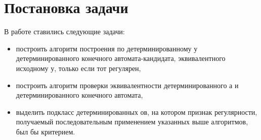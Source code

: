 \chapter{Постановка задачи} \label{chapt_task}
В работе ставились следующие задачи: 
\begin{itemize}
	\item построить алгоритм построения по детерминированному \LGraph у детерминированного конечного автомата-кандидата, эквивалентного исходному \LGraph у, только если тот регулярен,
	\item построить алгоритм проверки эквивалентности детерминированного \LGraph а и детерминированного конечного автомата,
	\item выделить подкласс детерминированных \LGraph ов, на котором признак регулярности, получаемый последовательным применением указанных выше алгоритмов, был бы критерием.
\end{itemize}
\clearpage